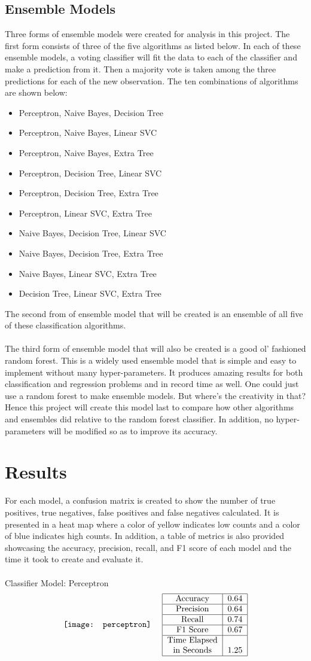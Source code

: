 \documentclass{article}
\newcommand{\scoring}[5]{\begin{tabular}{|c|c|} \hline 
Accuracy & #1 \\ \hline Precision & #1 \\ \hline 
Recall & #3 \\ \hline F1 Score & #4 \\ \hline Time Elapsed & \\ in Seconds & #5 \\ \hline \end{tabular}}
\begin{document}
\subsection{Ensemble Models}
Three forms of ensemble models were created for analysis in this project. The first form consists of three of the five algorithms as listed below. In each of these ensemble models, a voting classifier will fit the data to each of the classifier and make a prediction from it. Then a majority vote is taken among the three predictions for each of the new observation. The ten combinations of algorithms are shown below: 
\begin{itemize} 
\item Perceptron, Naive Bayes, Decision Tree
\item Perceptron, Naive Bayes, Linear SVC 
\item  Perceptron, Naive Bayes, Extra Tree 
\item  Perceptron, Decision Tree, Linear SVC 
\item Perceptron, Decision Tree, Extra Tree 
\item Perceptron, Linear SVC, Extra Tree 
\item Naive Bayes, Decision Tree, Linear SVC
\item Naive Bayes, Decision Tree, Extra Tree
\item Naive Bayes, Linear SVC, Extra Tree
\item Decision Tree, Linear SVC, Extra Tree \end{itemize} 
The second from of ensemble model that will be created is an ensemble of all five of these classification algorithms. \\~\\
The third form of ensemble model that will also be created is a good ol' fashioned random forest. This is a widely used ensemble model that is simple and easy to implement without many hyper-parameters. It produces amazing results for both classification and regression problems and in record time as well. One could just use a random forest to make ensemble models. But where's the creativity in that? Hence this project will create this model last to compare how other algorithms and ensembles did relative to the random forest classifier. In addition, no hyper-parameters will be modified so as to improve its accuracy. 

\section{Results}
For each model, a confusion matrix is created to show the number of true positives, true negatives, false positives and false negatives calculated. It is presented in a heat map where a color of yellow indicates low counts and a color of blue indicates high counts. In addition, a table of metrics is also provided showcasing the accuracy, precision, recall, and F1 score of each model and the time it took to create and evaluate it. \\~\\
Classifier Model: Perceptron
$$ \texttt{[image: perceptron]} ~~~~ \scoring{0.64}{0.61}{0.74}{0.67}{1.25} $$ 
\end{document}
